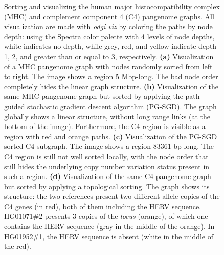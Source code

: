 \begin{figure}[!htb]
    \caption{
        Sorting and visualizing the human major histocompatibility complex (MHC) and complement component 4 (C4) pangenome graphs.
        All visualization are made with \textit{odgi viz} by coloring the paths by node depth:
        using the Spectra color palette with 4 levels of node depths, white indicates no depth, while grey, red, and yellow indicate depth 1, 2, and greater than or equal to 3, respectively.
        \textbf{(a)} Visualization of a MHC pangenome graph with nodes randomly sorted from left to right.
        The image shows a region 5 Mbp-long.
        The bad node order completely hides the linear graph structure.
        \textbf{(b)} Visualization of the same MHC pangenome graph but sorted by applying the path-guided stochastic gradient descent algorithm (PG-SGD).
        The graph globally shows a linear structure, without long range links (at the bottom of the image).
        Furthermore, the C4 region is visible as a region with red and orange paths.
        \textbf{(c)} Visualization of the PG-SGD sorted C4 subgraph.
        The image shows a region 83361 bp-long.
        The C4 region is still not well sorted locally, with the node order that still hides the underlying copy number variation status present in such a region.
        \textbf{(d)} Visualization of the same C4 pangenome graph but sorted by applying a topological sorting.
        The graph shows its structure: the two references present two different allele copies of the C4 genes (in red), both of them including the HERV sequence.
        HG01071\#2 presents 3 copies of the \textit{locus} (orange), of which one contains the HERV sequence (gray in the middle of the orange).
        In HG01952\#1, the HERV sequence is absent (white in the middle of the red).
    }
    \label{fig:sorting}
\end{figure}
